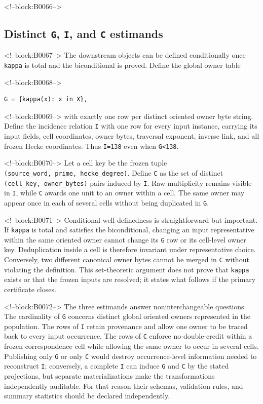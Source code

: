 \documentclass[11pt]{article}
\begin{document}
<!--block:B0066-->
\hypertarget{44-distinct-g-i-and-c-estimands}{%
\subsection{\texorpdfstring{Distinct \texttt{G}, \texttt{I}, and
\texttt{C}
estimands}{Distinct G, I, and C estimands}}\label{44-distinct-g-i-and-c-estimands}}

<!--block:B0067-->
The downstream objects can be defined conditionally once \texttt{kappa}
is total and the biconditional is proved. Define the global owner table

<!--block:B0068-->
\begin{verbatim}
G = {kappa(x): x in X},
\end{verbatim}

<!--block:B0069-->
with exactly one row per distinct oriented owner byte string. Define the
incidence relation \texttt{I} with one row for every input instance,
carrying its input fields, cell coordinates, owner bytes, traversal
exponent, inverse link, and all frozen Hecke coordinates. Thus
\texttt{\textbar{}I\textbar{}=138} even when
\texttt{\textbar{}G\textbar{}\textless{}138}.

<!--block:B0070-->
Let a cell key be the frozen tuple
\texttt{(source\_word,\ prime,\ hecke\_degree)}. Define \texttt{C} as
the set of distinct \texttt{(cell\_key,\ owner\_bytes)} pairs induced by
\texttt{I}. Raw multiplicity remains visible in \texttt{I}, while
\texttt{C} awards one unit to an owner within a cell. The same owner may
appear once in each of several cells without being duplicated in
\texttt{G}.

<!--block:B0071-->
Conditional well-definedness is straightforward but important. If
\texttt{kappa} is total and satisfies the biconditional, changing an
input representative within the same oriented owner cannot change its
\texttt{G} row or its cell-level owner key. Deduplication inside a cell
is therefore invariant under representative choice. Conversely, two
different canonical owner bytes cannot be merged in \texttt{C} without
violating the definition. This set-theoretic argument does not prove
that \texttt{kappa} exists or that the frozen inputs are resolved; it
states what follows if the primary certificate closes.

<!--block:B0072-->
The three estimands answer noninterchangeable questions. The cardinality
of \texttt{G} concerns distinct global oriented owners represented in
the population. The rows of \texttt{I} retain provenance and allow one
owner to be traced back to every input occurrence. The rows of
\texttt{C} enforce no-double-credit within a frozen correspondence cell
while allowing the same owner to occur in several cells. Publishing only
\texttt{G} or only \texttt{C} would destroy occurrence-level information
needed to reconstruct \texttt{I}; conversely, a complete \texttt{I} can
induce \texttt{G} and \texttt{C} by the stated projections, but separate
materializations make the transformations independently auditable. For
that reason their schemas, validation rules, and summary statistics
should be declared independently.
\end{document}
